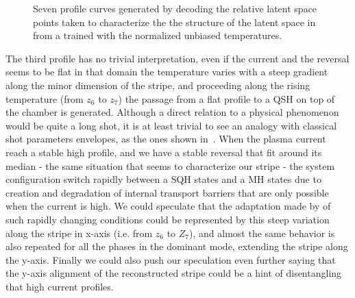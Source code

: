 \begin{figure}
    \caption{Seven profile curves generated by decoding the relative latent space points taken to characterize the the structure of the latent space in~\Figure{\ref{fig:VAE2_qsh_ls_preconditioned}} from a  trained with the normalized unbiased temperatures. }
    \label{fig:VAE2_qsh_gen_prec}
\end{figure}
The third profile has no trivial interpretation, even if the current and the reversal seems to be flat in that domain the temperature varies with a steep gradient along the minor dimension of the stripe, and proceeding along the rising temperature (from $z_6$ to $z_7$) the passage from a flat profile to a QSH on top of the chamber is generated.
Although a direct relation to a physical phenomenon would be quite a long shot, it is at least trivial to see an analogy with classical \RFXmod shot parameters envelopes, as the ones shown in~\Figure{\ref{fig:rfx_shot_22069}}. When the plasma current reach a stable high profile, and we have a stable reversal that fit around its median - the same situation that seems to characterize our stripe - the system configuration switch rapidly between a SQH states and a MH states due to creation and degradation of internal transport barriers that are only possible when the current is high. We could speculate that the adaptation made by  of such rapidly changing conditions could be represented by this steep variation along the stripe in x-axis (i.e. from $z_6$ to $Z_7$), and almost the same behavior is also repeated for all the phases in the dominant mode, extending the stripe along the y-axis.
Finally we could also push our speculation even further saying that the y-axis alignment of the reconstructed stripe could be a hint of disentangling that high current profiles.


                                                      

